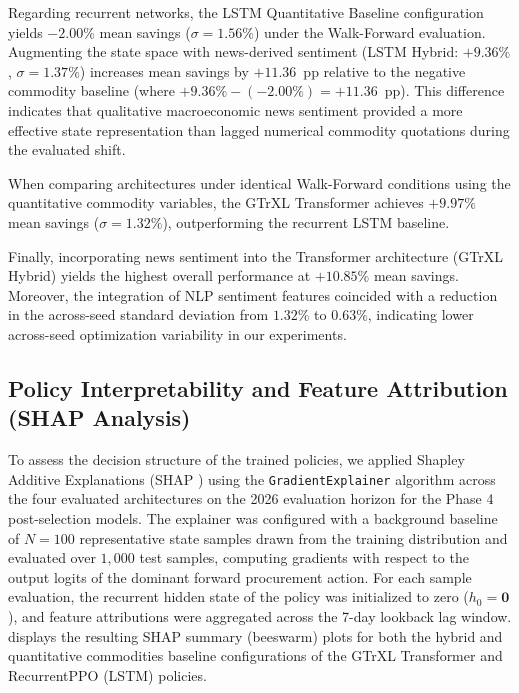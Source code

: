 Regarding recurrent networks, the LSTM Quantitative Baseline configuration yields $-2.00\%$ mean savings ($\sigma = 1.56\%$) under the Walk-Forward evaluation. Augmenting the state space with news-derived sentiment (LSTM Hybrid: $+9.36\%$, $\sigma = 1.37\%$) increases mean savings by $+11.36$~pp relative to the negative commodity baseline (where $+9.36\% - (-2.00\%) = +11.36$~pp). This difference indicates that qualitative macroeconomic news sentiment provided a more effective state representation than lagged numerical commodity quotations during the evaluated shift.

When comparing architectures under identical Walk-Forward conditions using the quantitative commodity variables, the GTrXL Transformer achieves $+9.97\%$ mean savings ($\sigma = 1.32\%$), outperforming the recurrent LSTM baseline.

Finally, incorporating news sentiment into the Transformer architecture (GTrXL Hybrid) yields the highest overall performance at $+10.85\%$ mean savings. Moreover, the integration of NLP sentiment features coincided with a reduction in the across-seed standard deviation from $1.32\%$ to $0.63\%$, indicating lower across-seed optimization variability in our experiments.

\subsection{Policy Interpretability and Feature Attribution (SHAP Analysis)}
\label{subsec:res_shap}

To assess the decision structure of the trained policies, we applied Shapley Additive Explanations (SHAP \cite{lundberg2017unified}) using the \texttt{GradientExplainer} algorithm across the four evaluated architectures on the 2026 evaluation horizon for the Phase 4 post-selection models. The explainer was configured with a background baseline of $N = 100$ representative state samples drawn from the training distribution and evaluated over $1{,}000$ test samples, computing gradients with respect to the output logits of the dominant forward procurement action. For each sample evaluation, the recurrent hidden state of the policy was initialized to zero ($h_0 = \mathbf{0}$), and feature attributions were aggregated across the 7-day lookback lag window.  displays the resulting SHAP summary (beeswarm) plots for both the hybrid and quantitative commodities baseline configurations of the GTrXL Transformer and RecurrentPPO (LSTM) policies.

